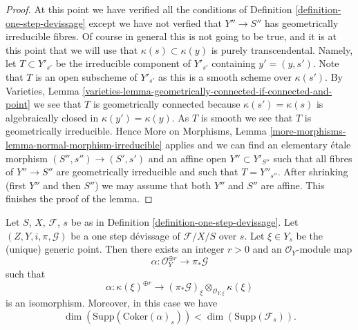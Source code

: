 \begin{proof}
\medskip\noindent
At this point we have verified all the conditions of
Definition \ref{definition-one-step-devissage}
except we have not verfied that $Y'' \to S''$ has geometrically
irreducible fibres. Of course in general this is not going to be
true, and it is at this point that we will use that
$\kappa(s) \subset \kappa(y)$ is purely transcendental. Namely,
let $T \subset Y'_{s'}$ be the irreducible component of
$Y'_{s'}$ containing $y' = (y, s')$. Note that $T$ is an open subscheme
of $Y'_{s'}$ as this is a smooth scheme over $\kappa(s')$. By
Varieties,
Lemma \ref{varieties-lemma-geometrically-connected-if-connected-and-point}
we see that $T$ is geometrically connected because $\kappa(s') = \kappa(s)$
is algebraically closed in $\kappa(y') = \kappa(y)$.
As $T$ is smooth we see that $T$ is geometrically irreducible. Hence
More on Morphisms,
Lemma \ref{more-morphisms-lemma-normal-morphism-irreducible}
applies and we can find an elementary \'etale morphism
$(S'', s'') \to (S', s')$ and an affine open $Y'' \subset Y'_{S''}$
such that all fibres of $Y'' \to S''$ are geometrically irreducible
and such that $T = Y''_{s''}$. After shrinking (first $Y''$ and then $S''$)
we may assume that both $Y''$ and $S''$ are affine.
This finishes the proof of the lemma.
\end{proof}

\begin{lemma}
\label{lemma-existence-alpha}
Let $S$, $X$, $\mathcal{F}$, $s$ be as in
Definition \ref{definition-one-step-devissage}.
Let $(Z, Y, i, \pi, \mathcal{G})$ be a one step d\'evissage
of $\mathcal{F}/X/S$ over $s$.
Let $\xi \in Y_s$ be the (unique) generic point.
Then there exists an integer $r > 0$ and an $\mathcal{O}_Y$-module map
$$
\alpha : \mathcal{O}_Y^{\oplus r} \longrightarrow \pi_*\mathcal{G}
$$
such that
$$
\alpha :
\kappa(\xi)^{\oplus r}
\longrightarrow
(\pi_*\mathcal{G})_\xi \otimes_{\mathcal{O}_{Y, \xi}} \kappa(\xi)
$$
is an isomorphism. Moreover, in this case we have
$$
\dim(\text{Supp}(\text{Coker}(\alpha)_s)) < \dim(\text{Supp}(\mathcal{F}_s)).
$$
\end{lemma}

